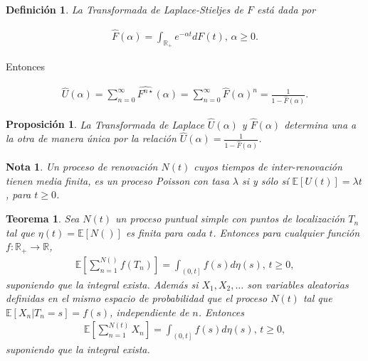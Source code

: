 \documentclass{article}
\newtheorem{Def}{Definición}[section]
\newtheorem{Teo}{Teorema}[section]
\newtheorem{Note}{Nota}[section]
\newtheorem{Prop}{Proposición}[section]
\newcommand{\rea}{\mathbb{R}}
\newcommand{\esp}{\mathbb{E}}
\numberwithin{equation}{section}
\begin{document}
{\begin{Def}
La Transformada de Laplace-Stieljes de $F$ est\'a dada por

\begin{eqnarray*}
\hat{F}\left(\alpha\right)=\int_{\rea_{+}}e^{-\alpha t}dF\left(t\right)\textrm{,  }\alpha\geq0.
\end{eqnarray*}
\end{Def}

Entonces

\begin{eqnarray*}
\hat{U}\left(\alpha\right)=\sum_{n=0}^{\infty}\hat{F^{n\star}}\left(\alpha\right)=\sum_{n=0}^{\infty}\hat{F}\left(\alpha\right)^{n}=\frac{1}{1-\hat{F}\left(\alpha\right)}.
\end{eqnarray*}


\begin{Prop}
La Transformada de Laplace $\hat{U}\left(\alpha\right)$ y $\hat{F}\left(\alpha\right)$ determina una a la otra de manera \'unica por la relaci\'on $\hat{U}\left(\alpha\right)=\frac{1}{1-\hat{F}\left(\alpha\right)}$.
\end{Prop}


\begin{Note}
Un proceso de renovaci\'on $N\left(t\right)$ cuyos tiempos de inter-renovaci\'on tienen media finita, es un proceso Poisson con tasa $\lambda$ si y s\'olo s\'i $\esp\left[U\left(t\right)\right]=\lambda t$, para $t\geq0$.
\end{Note}


\begin{Teo}
Sea $N\left(t\right)$ un proceso puntual simple con puntos de localizaci\'on $T_{n}$ tal que $\eta\left(t\right)=\esp\left[N\left(\right)\right]$ es finita para cada $t$. Entonces para cualquier funci\'on $f:\rea_{+}\rightarrow\rea$,
\begin{eqnarray*}
\esp\left[\sum_{n=1}^{N\left(\right)}f\left(T_{n}\right)\right]=\int_{\left(0,t\right]}f\left(s\right)d\eta\left(s\right)\textrm{,  }t\geq0,
\end{eqnarray*}
suponiendo que la integral exista. Adem\'as si $X_{1},X_{2},\ldots$ son variables aleatorias definidas en el mismo espacio de probabilidad que el proceso $N\left(t\right)$ tal que $\esp\left[X_{n}|T_{n}=s\right]=f\left(s\right)$, independiente de $n$. Entonces
\begin{eqnarray*}
\esp\left[\sum_{n=1}^{N\left(t\right)}X_{n}\right]=\int_{\left(0,t\right]}f\left(s\right)d\eta\left(s\right)\textrm{,  }t\geq0,
\end{eqnarray*} 
suponiendo que la integral exista. 
\end{Teo}

}
\end{document}
